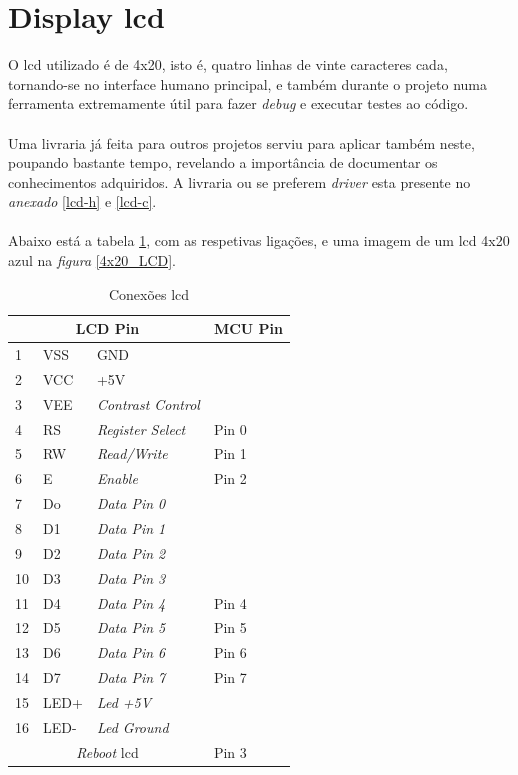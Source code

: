 \section{Display \acs{lcd}}
O \ac{lcd} utilizado é de 4x20, isto é, quatro linhas de vinte caracteres cada, tornando-se no interface humano principal, e também durante o projeto numa ferramenta extremamente útil para fazer \textit{debug} e executar testes ao código.
\\
\\
Uma livraria já feita para outros projetos serviu para aplicar também neste, poupando bastante tempo, revelando a importância de documentar os conhecimentos adquiridos. A livraria ou se preferem \textit{driver} esta presente no \textit{anexado} \ref{lcd-h} e \ref{lcd-c}.
\\
\\
Abaixo está a tabela \ref{LCD_connections}, com as respetivas ligações, e uma imagem de um \acs{lcd} 4x20 azul na \textit{figura} \ref{4x20_LCD}.
\begin{table}[H]
	\centering
	\caption{Conexões \acs{lcd}}
	\begin{tabular}{||p{1cm} p{2cm} p{4cm} | p{1cm}||} 
		\hline
		\multicolumn{3}{||c|}{\textbf{LCD Pin}} & \multicolumn{1}{|c||}{\textbf{MCU Pin}}\\ [1ex]
		\hline
		1 & VSS & GND & \\
		2 & VCC & +5V & \\
		3 & VEE & \textit{Contrast Control} & \\
		4 & RS & \textit{Register Select} & Pin 0 \\
		5 & RW & \textit{Read/Write} & Pin 1 \\
		6 & E & \textit{Enable} & Pin 2 \\
		7 & Do & \textit{Data Pin 0} & \\
		8 & D1 & \textit{Data Pin 1} & \\
		9 & D2 & \textit{Data Pin 2} & \\
		10 & D3 & \textit{Data Pin 3} & \\
		11 & D4 & \textit{Data Pin 4} & Pin 4 \\
		12 & D5 & \textit{Data Pin 5} & Pin 5 \\
		13 & D6 & \textit{Data Pin 6} & Pin 6 \\
		14 & D7 & \textit{Data Pin 7} & Pin 7 \\
		15 & LED+ & \textit{Led +5V} &  \\
		16 & LED- & \textit{Led Ground} & \\
		\multicolumn{3}{||c|}{\textit{Reboot} \acs{lcd}} & \multicolumn{1}{|l||}{Pin 3}\\ [1ex]
		\hline
	\end{tabular}	
	\label{LCD_connections}
\end{table}
